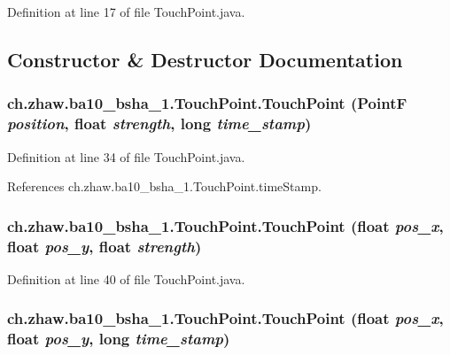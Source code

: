 Definition at line 17 of file TouchPoint.java.

\subsection{Constructor \& Destructor Documentation}
\hypertarget{classch_1_1zhaw_1_1ba10__bsha__1_1_1TouchPoint_a78cfb1506a0081d1e3175fde400290de}{
\subsubsection[{TouchPoint}]{\setlength{\rightskip}{0pt plus 5cm}ch.zhaw.ba10\_\-bsha\_\-1.TouchPoint.TouchPoint (PointF {\em position}, \/  float {\em strength}, \/  long {\em time\_\-stamp})}}
\label{classch_1_1zhaw_1_1ba10__bsha__1_1_1TouchPoint_a78cfb1506a0081d1e3175fde400290de}


Definition at line 34 of file TouchPoint.java.

References ch.zhaw.ba10\_\-bsha\_\-1.TouchPoint.timeStamp.\hypertarget{classch_1_1zhaw_1_1ba10__bsha__1_1_1TouchPoint_a56ef62d0be5dbcd46be0d65ea13e48b3}{
\subsubsection[{TouchPoint}]{\setlength{\rightskip}{0pt plus 5cm}ch.zhaw.ba10\_\-bsha\_\-1.TouchPoint.TouchPoint (float {\em pos\_\-x}, \/  float {\em pos\_\-y}, \/  float {\em strength})}}
\label{classch_1_1zhaw_1_1ba10__bsha__1_1_1TouchPoint_a56ef62d0be5dbcd46be0d65ea13e48b3}


Definition at line 40 of file TouchPoint.java.\hypertarget{classch_1_1zhaw_1_1ba10__bsha__1_1_1TouchPoint_ad3f4dd64b5c48581bd65cd2d777a1b96}{
\subsubsection[{TouchPoint}]{\setlength{\rightskip}{0pt plus 5cm}ch.zhaw.ba10\_\-bsha\_\-1.TouchPoint.TouchPoint (float {\em pos\_\-x}, \/  float {\em pos\_\-y}, \/  long {\em time\_\-stamp})}}
\label{classch_1_1zhaw_1_1ba10__bsha__1_1_1TouchPoint_ad3f4dd64b5c48581bd65cd2d777a1b96}


